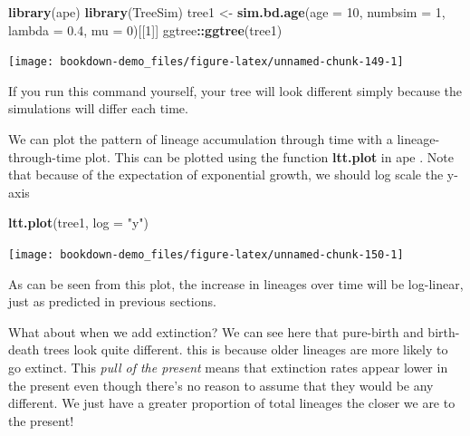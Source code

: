 \documentclass[
]{book}
\newenvironment{Shaded}{\begin{snugshade}}{\end{snugshade}}
\newcommand{\DataTypeTok}[1]{\textcolor[rgb]{0.13,0.29,0.53}{#1}}
\newcommand{\DecValTok}[1]{\textcolor[rgb]{0.00,0.00,0.81}{#1}}
\newcommand{\FloatTok}[1]{\textcolor[rgb]{0.00,0.00,0.81}{#1}}
\newcommand{\KeywordTok}[1]{\textcolor[rgb]{0.13,0.29,0.53}{\textbf{#1}}}
\newcommand{\NormalTok}[1]{#1}
\newcommand{\OperatorTok}[1]{\textcolor[rgb]{0.81,0.36,0.00}{\textbf{#1}}}
\newcommand{\StringTok}[1]{\textcolor[rgb]{0.31,0.60,0.02}{#1}}
\begin{document}
\begin{Shaded}
\begin{Highlighting}[]
\KeywordTok{library}\NormalTok{(ape)}
\KeywordTok{library}\NormalTok{(TreeSim)}
\NormalTok{tree1 \textless{}{-}}\StringTok{ }\KeywordTok{sim.bd.age}\NormalTok{(}\DataTypeTok{age =} \DecValTok{10}\NormalTok{, }\DataTypeTok{numbsim =} \DecValTok{1}\NormalTok{, }\DataTypeTok{lambda =} \FloatTok{0.4}\NormalTok{, }\DataTypeTok{mu =} \DecValTok{0}\NormalTok{)[[}\DecValTok{1}\NormalTok{]]}
\NormalTok{ggtree}\OperatorTok{::}\KeywordTok{ggtree}\NormalTok{(tree1)}
\end{Highlighting}
\end{Shaded}

\begin{center}\texttt{[image: bookdown-demo\_files/figure-latex/unnamed-chunk-149-1]} \end{center}

If you run this command yourself, your tree will look different simply because the simulations will differ each time.

We can plot the pattern of lineage accumulation through time with a lineage-through-time plot. This can be plotted using the function \textbf{ltt.plot} in ape \citep{ape}. Note that because of the expectation of exponential growth, we should log scale the y-axis

\begin{Shaded}
\begin{Highlighting}[]
\KeywordTok{ltt.plot}\NormalTok{(tree1, }\DataTypeTok{log =} \StringTok{"y"}\NormalTok{)}
\end{Highlighting}
\end{Shaded}

\begin{center}\texttt{[image: bookdown-demo\_files/figure-latex/unnamed-chunk-150-1]} \end{center}

As can be seen from this plot, the increase in lineages over time will be log-linear, just as predicted in previous sections.

What about when we add extinction? We can see here that pure-birth and birth-death trees look quite different. this is because older lineages are more likely to go extinct. This \emph{pull of the present} means that extinction rates appear lower in the present even though there's no reason to assume that they would be any different. We just have a greater proportion of total lineages the closer we are to the present!
\end{document}
